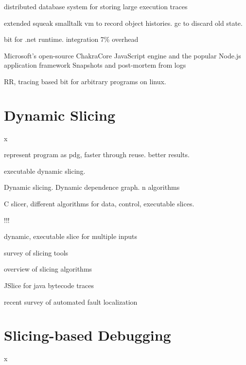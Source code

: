 \cite{pothier07:scalable_omniscient_debugging}
distributed database system for storing large execution traces

\cite{lienhard08:practical_object-oriented_back-in-time_debugging}
extended squeak smalltalk vm to record object histories.
gc to discard old state.

\cite{barr14:tardis_affordable_time-travel_debugging}
bit for .net runtime. integration 7\% overhead

\cite{barr16:time-travel_debugging_for_javascriptnode}
 Microsoft’s open-source ChakraCore JavaScript engine
and the popular Node.js application framework
Snapshots and post-mortem from logs

\cite{ocallahan17:engineering_record_and_replay}
RR, tracing based bit for arbitrary programs on linux.

\section{Dynamic Slicing}
\label{sec:rw_dynamic_slicing}
x
\newpage

\cite{ottenstein84:the_program_dependence_graph}
represent program as pdg, faster through reuse. better results.

\cite{korel88:dynamic_program_slicing}
executable dynamic slicing.

\cite{agrawal90:dynamic_program_slicing}
Dynamic slicing. Dynamic dependence graph. n algorithms


\cite{venkatesh95:experimental_results_from_dynamic}
C slicer, different algorithms for data, control, executable slices.

\cite{venkatesh91:the_semantic_approach}!!!

\cite{hall95:automatic_extraction_of_executable}
dynamic, executable slice for multiple inputs

\cite{hoffner95:evaluation_and_comparison}
survey of slicing tools

\cite{korel98:dynamic_program_slicing_methods}
overview of slicing algorithms

\cite{wang08:dynamic_slicing_on_java}
JSlice for java bytecode traces

\cite{wong16:a_survey_on_software}
recent survey of automated fault localization


\section{Slicing-based Debugging}
\label{sec:rw_slice_debugging}
x
\newpage

